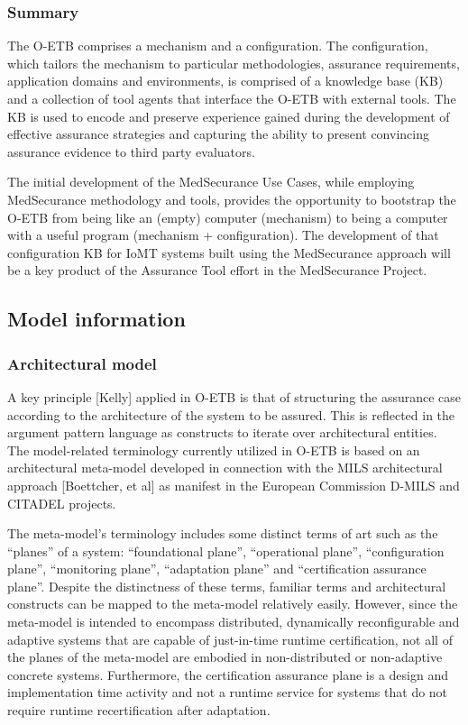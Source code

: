 \documentclass[12pt,twoside,a4paper]{article}
\begin{document}
\hypertarget{summary}{%
\subsubsection{Summary}\label{summary}}

The O-ETB comprises a mechanism and a configuration. The configuration, which tailors the mechanism to particular methodologies, assurance requirements, application domains and environments, is comprised of a knowledge base (KB) and a collection of tool agents that interface the O-ETB with external tools. The KB is used to encode and preserve experience gained during the development of effective assurance strategies and capturing the ability to present convincing assurance evidence to third party evaluators.

The initial development of the MedSecurance Use Cases, while employing MedSecurance methodology and tools, provides the opportunity to bootstrap the O-ETB from being like an (empty) computer (mechanism) to being a computer with a useful program (mechanism + configuration). The development of that configuration KB for IoMT systems built using the MedSecurance approach will be a key product of the Assurance Tool effort in the MedSecurance Project.

\hypertarget{model-information}{%
\subsection{Model information}\label{model-information}}

\hypertarget{architectural-model}{%
\subsubsection{Architectural model}\label{architectural-model}}

A key principle {[}Kelly{]} applied in O-ETB is that of structuring the assurance case according to the architecture of the system to be assured. This is reflected in the argument pattern language as constructs to iterate over architectural entities. The model-related terminology currently utilized in O-ETB is based on an architectural meta-model developed in connection with the MILS architectural approach {[}Boettcher, et al{]} as manifest in the European Commission D-MILS and CITADEL projects.

The meta-model's terminology includes some distinct terms of art such as the ``planes'' of a system: ``foundational plane'', ``operational plane'', ``configuration plane'', ``monitoring plane'', ``adaptation plane'' and ``certification assurance plane''. Despite the distinctness of these terms, familiar terms and architectural constructs can be mapped to the meta-model relatively easily. However, since the meta-model is intended to encompass distributed, dynamically reconfigurable and adaptive systems that are capable of just-in-time runtime certification, not all of the planes of the meta-model are embodied in non-distributed or non-adaptive concrete systems. Furthermore, the certification assurance plane is a design and implementation time activity and not a runtime service for systems that do not require runtime recertification after adaptation.
\end{document}
